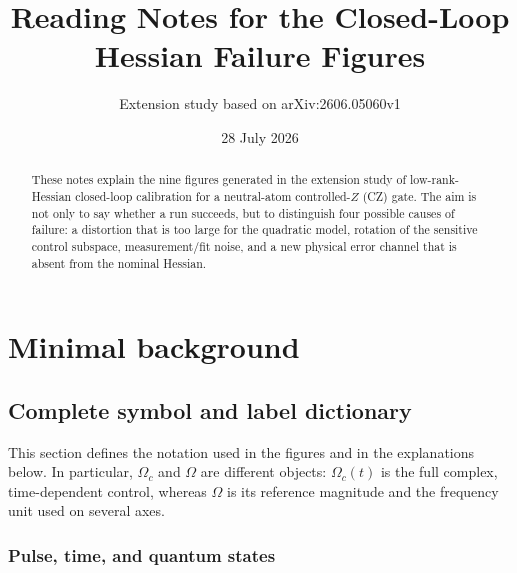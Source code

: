 \documentclass[11pt]{article}
\title{Reading Notes for the Closed-Loop Hessian Failure Figures}
\author{Extension study based on arXiv:2606.05060v1}
\date{28 July 2026}
\newcommand{\Om}{\Omega}
\begin{document}
\maketitle

\begin{abstract}
These notes explain the nine figures generated in the extension study of
low-rank-Hessian closed-loop calibration for a neutral-atom controlled-$Z$
(CZ) gate.  The aim is not only to say whether a run succeeds, but to
distinguish four possible causes of failure: a distortion that is too large
for the quadratic model, rotation of the sensitive control subspace,
measurement/fit noise, and a new physical error channel that is absent from
the nominal Hessian.
\end{abstract}

\tableofcontents
\newpage

\section{Minimal background}

\subsection{Complete symbol and label dictionary}

This section defines the notation used in the figures and in the explanations
below.  In particular, $\Om_c$ and $\Om$ are different objects:
$\Om_c(t)$ is the full complex, time-dependent control, whereas $\Om$ is its
reference magnitude and the frequency unit used on several axes.

\subsubsection{Pulse, time, and quantum states}
\end{document}
